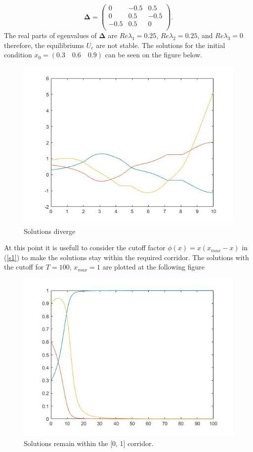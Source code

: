\documentclass[a4paper,10pt, english]{article}
\begin{document}
$$
\mathbf{\Delta} = 
\left(
\begin{matrix}
0   & -0.5 & 0.5 \\
0 &  0.5 & -0.5 \\
-0.5 &  0.5 & 0 \\
\end{matrix}
\right).
$$
The real parts of egenvalues of $\mathbf{\Delta}$ are  $Re\lambda_1 = 0.25$,  $Re\lambda_2 = 0.25$, and $Re\lambda_3 = 0$ therefore, the equilibriums 
$U_e$ are not stable. The solutions for the initial condition $x_0 = (0.3\quad 0.6\quad 0.9)$ can be seen on the figure below. 
\begin{figure}[ht]
\label{fig_osc}
\centering
\includegraphics[scale= 0.4]{explode.jpg}
\caption{Solutions diverge}
\end{figure}

At this point it is usefull to consider the cutoff factor $\phi(x) = x(x_{max} - x)$ in (\ref{s1})  to make the solutions stay within the required corridor. The solutions with the cutoff for $T=100$, $x_{max} = 1$ are plotted at the following figure
\begin{figure}[ht]
\label{fig_osc}
\centering
\includegraphics[scale= 0.4]{cutoff.jpg}
\caption{Solutions remain within the [0, 1] corridor.}
\end{figure}
\end{document}
